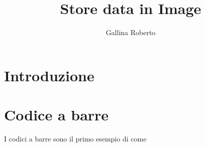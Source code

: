\documentclass[a4paper]{article}
\begin{document}
\title{Store data in Image}
\author{Gallina Roberto}

\maketitle

\newpage

\tableofcontents

\newpage

\section{Introduzione}



\section{Codice a barre}

I codici a barre sono il primo esempio di come 



        
        
        
        
        
            
\end{document}
